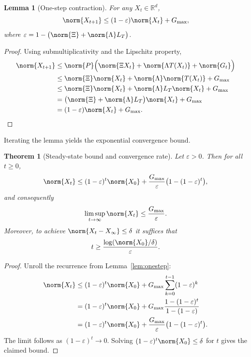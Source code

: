 \documentclass[11pt]{article}
\newtheorem{theorem}{Theorem}[chapter]
\newtheorem{lemma}{Lemma}[chapter]
\begin{document}
\begin{lemma}[One-step contraction]
    For any $X_t\in\mathbb{R}^d$,
    \begin{equation}
        \norm{X_{t+1}} \le (1-\varepsilon)\norm{X_t} + G_{\max},
    \end{equation}
    where $\varepsilon = 1 - \bigl(\norm{\Xi} + \norm{\Lambda}L_T\bigr)$.
\end{lemma}
\begin{proof}
    Using submultiplicativity and the Lipschitz property,
    \begin{align*}
        \norm{X_{t+1}}
        &\le \norm{P}\Bigl(\norm{\Xi X_t} + \norm{\Lambda T(X_t)} + \norm{G_t}\Bigr) \\
        &\le \norm{\Xi}\norm{X_t} + \norm{\Lambda}\norm{T(X_t)} + G_{\max} \\
        &\le \norm{\Xi}\norm{X_t} + \norm{\Lambda}L_T\norm{X_t} + G_{\max} \\
        &= \bigl(\norm{\Xi} + \norm{\Lambda}L_T\bigr)\norm{X_t} + G_{\max} \\
        &= (1-\varepsilon)\norm{X_t} + G_{\max}.
    \end{align*}
\end{proof}

Iterating the lemma yields the exponential convergence bound.

\begin{theorem}[Steady-state bound and convergence rate]
    Let $\varepsilon>0$. Then for all $t\ge 0$,
    \begin{equation}
        \norm{X_t} \le (1-\varepsilon)^t\norm{X_0} + \frac{G_{\max}}{\varepsilon}\bigl(1-(1-\varepsilon)^t\bigr),
    \end{equation}
    and consequently
    \begin{equation}
        \limsup_{t\to\infty}\norm{X_t} \le \frac{G_{\max}}{\varepsilon}.
    \end{equation}
    Moreover, to achieve $\norm{X_t - X_\infty}\le\delta$ it suffices that
    \begin{equation}
        t \ge \frac{\log(\norm{X_0}/\delta)}{\varepsilon}.
    \end{equation}
\end{theorem}
\begin{proof}
    Unroll the recurrence from Lemma~\ref{lem:onestep}:
    \begin{align*}
        \norm{X_t}
        &\le (1-\varepsilon)^t\norm{X_0} + G_{\max}\sum_{k=0}^{t-1}(1-\varepsilon)^k \\
        &= (1-\varepsilon)^t\norm{X_0} + G_{\max}\frac{1-(1-\varepsilon)^t}{1-(1-\varepsilon)} \\
        &= (1-\varepsilon)^t\norm{X_0} + \frac{G_{\max}}{\varepsilon}\bigl(1-(1-\varepsilon)^t\bigr).
    \end{align*}
    The limit follows as $(1-\varepsilon)^t\to0$. Solving
    $(1-\varepsilon)^t\norm{X_0}\le\delta$ for $t$ gives the claimed bound.
\end{proof}
\end{document}
